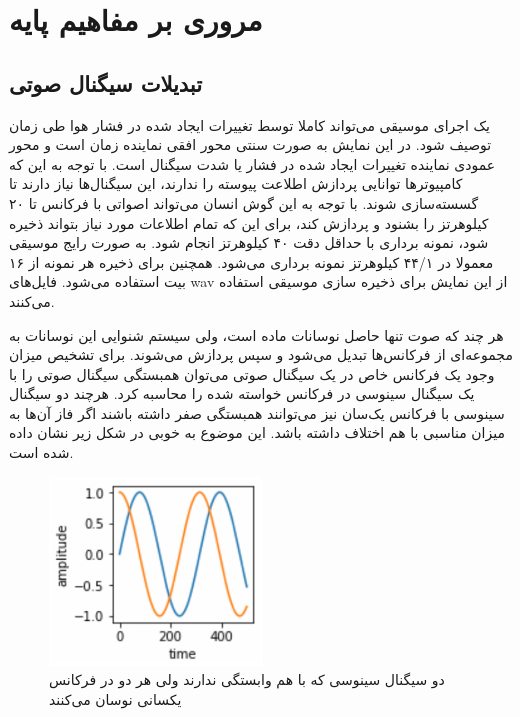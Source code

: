 \chapter{مروری بر مفاهیم پایه}
\section{تبدیلات سیگنال صوتی}
یک اجرای موسیقی می‌تواند کاملا توسط تغییرات ایجاد شده در فشار هوا طی زمان توصیف
شود. در این نمایش به صورت سنتی محور افقی نماینده زمان است و محور عمودی نماینده
تغییرات ایجاد شده در فشار یا شدت سیگنال است. با توجه به این که کامپیوترها
توانایی پردازش اطلاعت پیوسته را ندارند، این سیگنال‌ها نیاز دارند تا گسسته‌سازی
شوند. با توجه به این گوش انسان می‌تواند اصواتی با فرکانس تا ۲۰ کیلوهرتز را بشنود
و پردازش کند، برای این که تمام اطلاعات مورد نیاز بتواند ذخیره شود، نمونه برداری
با حداقل دقت ۴۰ کیلوهرتز انجام شود. به صورت رایج موسیقی معمولا در ۴۴/۱ کیلوهرتز
نمونه برداری می‌شود. همچنین برای ذخیره هر نمونه از ۱۶ بیت استفاده می‌شود.
فایل‌های wav از این نمایش برای ذخیره سازی موسیقی استفاده می‌کنند.

هر چند که صوت تنها حاصل نوسانات ماده است، ولی سیستم شنوایی این نوسانات به
مجموعه‌ای از فرکانس‌ها تبدیل می‌شود و سپس پردازش می‌شوند. برای تشخیص میزان وجود
یک فرکانس خاص در یک سیگنال صوتی می‌توان همبستگی سیگنال صوتی را با یک سیگنال
سینوسی در فرکانس خواسته شده را محاسبه کرد. هرچند دو سیگنال سینوسی با فرکانس
یک‌سان نیز می‌توانند همبستگی صفر داشته باشند اگر فاز آن‌ها به میزان مناسبی با هم
اختلاف داشته باشد. این موضوع به خوبی در شکل زیر نشان داده شده است.
\begin{figure}[ht]
    \centering
    \includegraphics[height=5cm]{./statics/uncorrelated_sine_waves.png}
    \caption{دو سیگنال سینوسی که با هم وابستگی ندارند ولی هر دو در فرکانس یکسانی نوسان می‌کنند}
\end{figure}

